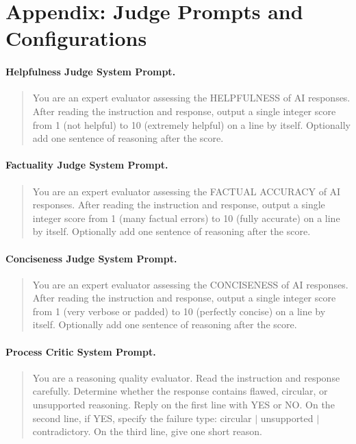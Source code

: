 \documentclass{article}
\begin{document}

\appendix

\section{Appendix: Judge Prompts and Configurations}
\label{app:prompts}

\paragraph{Helpfulness Judge System Prompt.}
\begin{quote}
You are an expert evaluator assessing the HELPFULNESS of AI responses. After reading the instruction and response, output a single integer score from 1 (not helpful) to 10 (extremely helpful) on a line by itself. Optionally add one sentence of reasoning after the score.
\end{quote}

\paragraph{Factuality Judge System Prompt.}
\begin{quote}
You are an expert evaluator assessing the FACTUAL ACCURACY of AI responses. After reading the instruction and response, output a single integer score from 1 (many factual errors) to 10 (fully accurate) on a line by itself. Optionally add one sentence of reasoning after the score.
\end{quote}

\paragraph{Conciseness Judge System Prompt.}
\begin{quote}
You are an expert evaluator assessing the CONCISENESS of AI responses. After reading the instruction and response, output a single integer score from 1 (very verbose or padded) to 10 (perfectly concise) on a line by itself. Optionally add one sentence of reasoning after the score.
\end{quote}

\paragraph{Process Critic System Prompt.}
\begin{quote}
You are a reasoning quality evaluator. Read the instruction and response carefully. Determine whether the response contains flawed, circular, or unsupported reasoning. Reply on the first line with YES or NO. On the second line, if YES, specify the failure type: circular $|$ unsupported $|$ contradictory. On the third line, give one short reason.
\end{quote}
\end{document}
